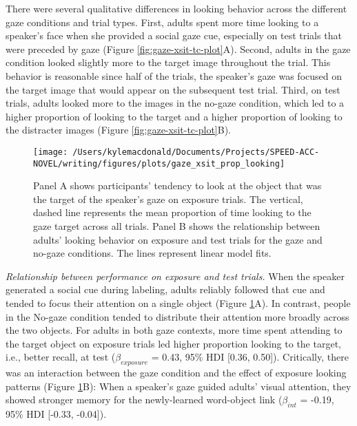 \documentclass[oneside]{report}
\begin{document}
There were several qualitative differences in looking behavior across
the different gaze conditions and trial types. First, adults spent more
time looking to a speaker's face when she provided a social gaze cue,
especially on test trials that were preceded by gaze (Figure
\ref{fig:gaze-xsit-tc-plot}A). Second, adults in the gaze condition
looked slightly more to the target image throughout the trial. This
behavior is reasonable since half of the trials, the speaker's gaze was
focused on the target image that would appear on the subsequent test
trial. Third, on test trials, adults looked more to the images in the
no-gaze condition, which led to a higher proportion of looking to the
target and a higher proportion of looking to the distracter images
(Figure \ref{fig:gaze-xsit-tc-plot}B).
\begin{figure}[!t]

{\centering \texttt{[image: /Users/kylemacdonald/Documents/Projects/SPEED-ACC-NOVEL/writing/figures/plots/gaze\_xsit\_prop\_looking]} 

}

\caption[Distribution of visual attention to speaker and objects in Experiment 5.2.]{Panel A shows participants’ tendency to look at the object that was the target of the speaker’s gaze on exposure trials. The vertical, dashed line represents the mean proportion of time looking to the gaze target across all trials. Panel B shows the relationship between adults' looking behavior on exposure and test trials for the gaze and no-gaze conditions. The lines represent linear model fits.}\label{fig:gaze-xsit-prop-looking-plot}
\end{figure}
\emph{Relationship between performance on exposure and test trials.}
When the speaker generated a social cue during labeling, adults reliably
followed that cue and tended to focus their attention on a single object
(Figure \ref{fig:gaze-xsit-prop-looking-plot}A). In contrast, people in
the No-gaze condition tended to distribute their attention more broadly
across the two objects. For adults in both gaze contexts, more time
spent attending to the target object on exposure trials led higher
proportion looking to the target, i.e., better recall, at test
(\(\beta_{exposure}\) = 0.43, 95\% HDI {[}0.36, 0.50{]}). Critically,
there was an interaction between the gaze condition and the effect of
exposure looking patterns (Figure
\ref{fig:gaze-xsit-prop-looking-plot}B): When a speaker's gaze guided
adults' visual attention, they showed stronger memory for the
newly-learned word-object link (\(\beta_{int}\) = -0.19, 95\% HDI
{[}-0.33, -0.04{]}).
\end{document}
